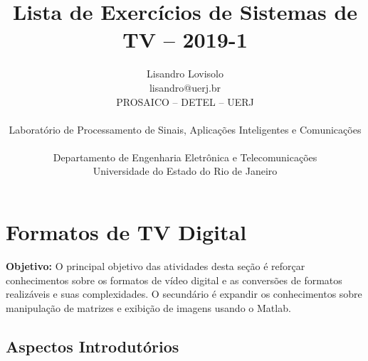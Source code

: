 \documentclass[11pt]{article}
\begin{document}
 

\title{Lista de Exercícios de Sistemas de TV -- 2019-1}
\author{Lisandro Lovisolo \\ lisandro@uerj.br \\ PROSAICO -- DETEL -- UERJ \\ \begin{small} Laboratório de Processamento de Sinais, Aplicações Inteligentes e Comunicações \end{small} \\ Departamento de Engenharia Eletrônica e Telecomunicações \\ Universidade do Estado do Rio de Janeiro}

\maketitle




\section{Formatos de TV Digital}

\textbf{Objetivo:} O principal objetivo das atividades desta seção é reforçar conhecimentos sobre os formatos de vídeo digital e as conversões de formatos realizáveis e suas complexidades. O secundário é expandir os conhecimentos sobre manipulação de matrizes e exibição de imagens usando o \textsf{Matlab}.

\subsection{Aspectos Introdutórios}
\end{document}
